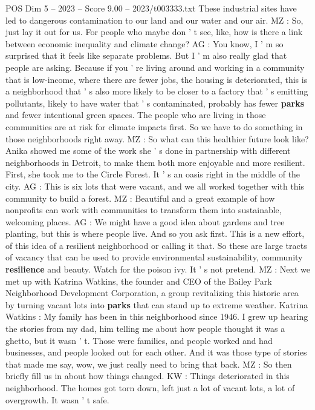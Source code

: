 \begin{textsample}{POS Dim 5 – 2023 – Score 9.00 – 2023/t003333.txt}
These industrial sites have led to dangerous contamination to our land and our water and our air.
MZ : So, just lay it out for us.
For people who maybe don ' t see, like, how is there a link between economic inequality and climate change?
AG : You know, I ' m so surprised that it feels like separate problems.
But I ' m also really glad that people are asking.
Because if you ' re living around and working in a community that is low-income, where there are fewer jobs, the housing is deteriorated, this is a neighborhood that ' s also more likely to be closer to a factory that ' s emitting pollutants, likely to have water that ' s contaminated, probably has fewer \textbf{parks} and fewer intentional green spaces.
The people who are living in those communities are at risk for climate impacts first.
So we have to do something in those neighborhoods right away.
MZ : So what can this healthier future look like?
Anika showed me some of the work she ' s done in partnership with different neighborhoods in Detroit, to make them both more enjoyable and more resilient.
First, she took me to the Circle Forest.
It ' s an oasis right in the middle of the city.
AG : This is six lots that were vacant, and we all worked together with this community to build a forest.
MZ : Beautiful and a great example of how nonprofits can work with communities to transform them into sustainable, welcoming places.
AG : We might have a good idea about gardens and tree planting, but this is where people live.
And so you ask first.
This is a new effort, of this idea of a resilient neighborhood or calling it that.
So these are large tracts of vacancy that can be used to provide environmental sustainability, community \textbf{resilience} and beauty.
Watch for the poison ivy.
It ' s not pretend.
MZ : Next we met up with Katrina Watkins, the founder and CEO of the Bailey Park Neighborhood Development Corporation, a group revitalizing this historic area by turning vacant lots into \textbf{parks} that can stand up to extreme weather.
Katrina Watkins : My family has been in this neighborhood since 1946.
I grew up hearing the stories from my dad, him telling me about how people thought it was a ghetto, but it wasn ' t.
Those were families, and people worked and had businesses, and people looked out for each other.
And it was those type of stories that made me say, wow, we just really need to bring that back.
MZ : So then briefly fill us in about how things changed.
KW : Things deteriorated in this neighborhood.
The homes got torn down, left just a lot of vacant lots, a lot of overgrowth.
It wasn ' t safe.

\end{textsample}
